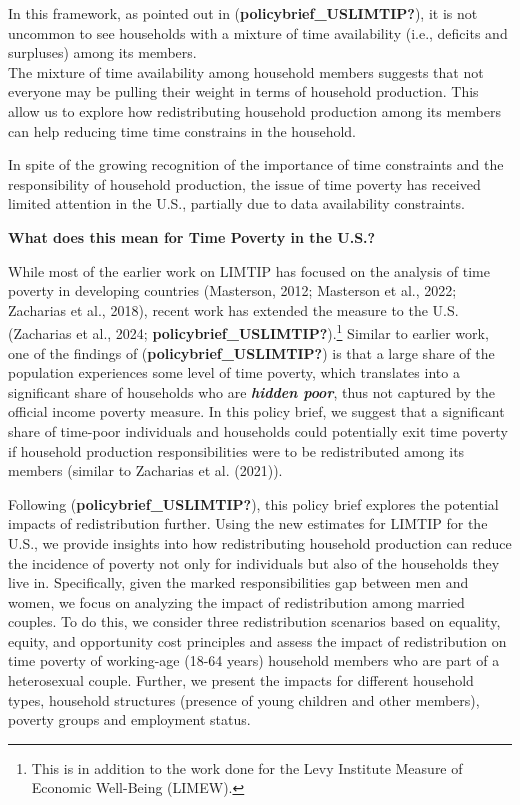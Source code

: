 \documentclass[
  11pt,
]{article}
\begin{document}
In this framework, as pointed out in (\textbf{policybrief\_USLIMTIP?}),
it is not uncommon to see households with a mixture of time availability
(i.e., deficits and surpluses) among its members.\\
The mixture of time availability among household members suggests that
not everyone may be pulling their weight in terms of household
production. This allow us to explore how redistributing household
production among its members can help reducing time time constrains in
the household.

In spite of the growing recognition of the importance of time
constraints and the responsibility of household production, the issue of
time poverty has received limited attention in the U.S., partially due
to data availability constraints.

\textbf{What does this mean for Time Poverty in the U.S.?}

While most of the earlier work on LIMTIP has focused on the analysis of
time poverty in developing countries (Masterson, 2012; Masterson et al.,
2022; Zacharias et al., 2018), recent work has extended the measure to
the U.S. (Zacharias et al., 2024;
\textbf{policybrief\_USLIMTIP?}).\footnote{This is in addition to the
  work done for the Levy Institute Measure of Economic Well-Being
  (LIMEW).} Similar to earlier work, one of the findings of
(\textbf{policybrief\_USLIMTIP?}) is that a large share of the
population experiences some level of time poverty, which translates into
a significant share of households who are \textbf{\emph{hidden poor}},
thus not captured by the official income poverty measure. In this policy
brief, we suggest that a significant share of time-poor individuals and
households could potentially exit time poverty if household production
responsibilities were to be redistributed among its members (similar to
Zacharias et al. (2021)).

Following (\textbf{policybrief\_USLIMTIP?}), this policy brief explores
the potential impacts of redistribution further. Using the new estimates
for LIMTIP for the U.S., we provide insights into how redistributing
household production can reduce the incidence of poverty not only for
individuals but also of the households they live in. Specifically, given
the marked responsibilities gap between men and women, we focus on
analyzing the impact of redistribution among married couples. To do
this, we consider three redistribution scenarios based on equality,
equity, and opportunity cost principles and assess the impact of
redistribution on time poverty of working-age (18-64 years) household
members who are part of a heterosexual couple. Further, we present the
impacts for different household types, household structures (presence of
young children and other members), poverty groups and employment status.
\end{document}
